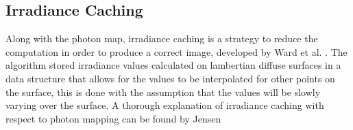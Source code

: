 \subsection{Irradiance Caching}
Along with the photon map, irradiance caching is a strategy to reduce the computation in order to
produce a correct image, developed by Ward et al. \cite{Ward88}. The algorithm stored irradiance
values calculated on lambertian diffuse surfaces in a data structure that allows for the values
to be interpolated for other points on the surface, this is done with the assumption that the
values will be slowly varying over the surface. A thorough explanation of irradiance caching with
respect to photon mapping can be found by Jensen \cite{JensenBook}
